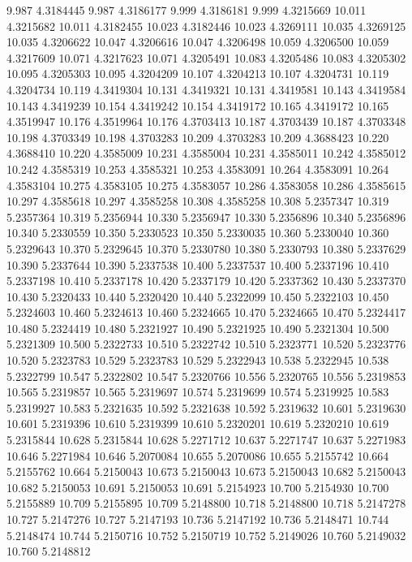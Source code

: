 9.987 4.3184445
9.987 4.3186177
9.999 4.3186181
9.999 4.3215669
10.011 4.3215682
10.011 4.3182455
10.023 4.3182446
10.023 4.3269111
10.035 4.3269125
10.035 4.3206622
10.047 4.3206616
10.047 4.3206498
10.059 4.3206500
10.059 4.3217609
10.071 4.3217623
10.071 4.3205491
10.083 4.3205486
10.083 4.3205302
10.095 4.3205303
10.095 4.3204209
10.107 4.3204213
10.107 4.3204731
10.119 4.3204734
10.119 4.3419304
10.131 4.3419321
10.131 4.3419581
10.143 4.3419584
10.143 4.3419239
10.154 4.3419242
10.154 4.3419172
10.165 4.3419172
10.165 4.3519947
10.176 4.3519964
10.176 4.3703413
10.187 4.3703439
10.187 4.3703348
10.198 4.3703349
10.198 4.3703283
10.209 4.3703283
10.209 4.3688423
10.220 4.3688410
10.220 4.3585009
10.231 4.3585004
10.231 4.3585011
10.242 4.3585012
10.242 4.3585319
10.253 4.3585321
10.253 4.3583091
10.264 4.3583091
10.264 4.3583104
10.275 4.3583105
10.275 4.3583057
10.286 4.3583058
10.286 4.3585615
10.297 4.3585618
10.297 4.3585258
10.308 4.3585258
10.308 5.2357347
10.319 5.2357364
10.319 5.2356944
10.330 5.2356947
10.330 5.2356896
10.340 5.2356896
10.340 5.2330559
10.350 5.2330523
10.350 5.2330035
10.360 5.2330040
10.360 5.2329643
10.370 5.2329645
10.370 5.2330780
10.380 5.2330793
10.380 5.2337629
10.390 5.2337644
10.390 5.2337538
10.400 5.2337537
10.400 5.2337196
10.410 5.2337198
10.410 5.2337178
10.420 5.2337179
10.420 5.2337362
10.430 5.2337370
10.430 5.2320433
10.440 5.2320420
10.440 5.2322099
10.450 5.2322103
10.450 5.2324603
10.460 5.2324613
10.460 5.2324665
10.470 5.2324665
10.470 5.2324417
10.480 5.2324419
10.480 5.2321927
10.490 5.2321925
10.490 5.2321304
10.500 5.2321309
10.500 5.2322733
10.510 5.2322742
10.510 5.2323771
10.520 5.2323776
10.520 5.2323783
10.529 5.2323783
10.529 5.2322943
10.538 5.2322945
10.538 5.2322799
10.547 5.2322802
10.547 5.2320766
10.556 5.2320765
10.556 5.2319853
10.565 5.2319857
10.565 5.2319697
10.574 5.2319699
10.574 5.2319925
10.583 5.2319927
10.583 5.2321635
10.592 5.2321638
10.592 5.2319632
10.601 5.2319630
10.601 5.2319396
10.610 5.2319399
10.610 5.2320201
10.619 5.2320210
10.619 5.2315844
10.628 5.2315844
10.628 5.2271712
10.637 5.2271747
10.637 5.2271983
10.646 5.2271984
10.646 5.2070084
10.655 5.2070086
10.655 5.2155742
10.664 5.2155762
10.664 5.2150043
10.673 5.2150043
10.673 5.2150043
10.682 5.2150043
10.682 5.2150053
10.691 5.2150053
10.691 5.2154923
10.700 5.2154930
10.700 5.2155889
10.709 5.2155895
10.709 5.2148800
10.718 5.2148800
10.718 5.2147278
10.727 5.2147276
10.727 5.2147193
10.736 5.2147192
10.736 5.2148471
10.744 5.2148474
10.744 5.2150716
10.752 5.2150719
10.752 5.2149026
10.760 5.2149032
10.760 5.2148812
